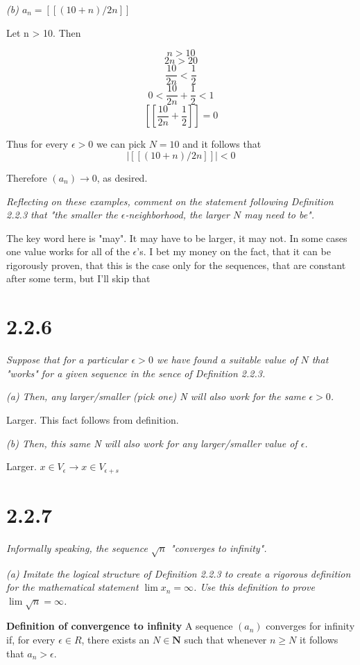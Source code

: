 \documentclass[11pt,oneside,titlepage]{book}
\begin{document}
\textit{(b) $a_n = [[(10 + n)/2n]]$}

Let n > 10. Then

$$n > 10$$
$$2n > 20$$
$$\frac{10}{2n} < \frac{1}{2}$$
$$0 < \frac{10}{2n} + \frac{1}{2} < 1$$
$$[[\frac{10}{2n} + \frac{1}{2} ]] = 0$$

Thus for every $\epsilon > 0$ we can pick $N = 10$ and it follows that 
$$|[[(10 + n)/2n]]| < 0$$

Therefore $(a_n) \to 0$, as desired.

\textit{Reflecting on these examples, comment on the statement following Definition
  2.2.3 that "the smaller the $\epsilon$-neighborhood, the larger $N$ may
  need to be".}

The key word here is "may". It may have to be larger, it may not. In some cases one
value works for all of the $\epsilon$'s. I bet my money on the fact, that it  can be rigorously proven, that this is the case only for the sequences, that are constant after
some term, but I'll skip that

\section*{2.2.6}
\textit{Suppose that for a particular $\epsilon > 0$ we have found a suitable
  value of $N$ that "works" for a given sequence in the sence of Definition 2.2.3.}

\textit{(a) Then, any larger/smaller (pick one) N will also work for the same $\epsilon > 0$.}

Larger. This fact follows from definition.

\textit{(b) Then, this same N will also work for any larger/smaller value of $\epsilon$.}

Larger. $x \in V_\epsilon \to x \in V_{\epsilon + s}$

\section*{2.2.7}
\textit{Informally speaking, the sequence $\sqrt{n}$ "converges to infinity".}

\textit{(a) Imitate the logical structure of Definition 2.2.3 to create a rigorous definition
  for the mathematical statement $\lim x_n = \infty$. Use this definition to prove
  $\lim \sqrt{n} = \infty$.}

\textbf{Definition of convergence to infinity}
A sequence $(a_n)$ converges for infinity if, for every $\epsilon \in R$, there exists an
$N \in \textbf{N}$ such that whenever $n \geq N$ it follows that $a_n > \epsilon$.
\end{document}
